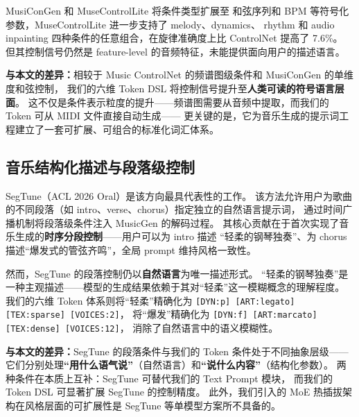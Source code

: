 MusiConGen\cite{musecong} 和 MuseControlLite\cite{muselite} 将条件类型扩展至
和弦序列和 BPM 等符号化参数，MuseControlLite 进一步支持了 melody、dynamics、
rhythm 和 audio inpainting 四种条件的任意组合，在旋律准确度上比 ControlNet 提高了 7.6\%。
但其控制信号仍然是 feature-level 的音频特征，未能提供面向用户的描述语言。

\textbf{与本文的差异：}相较于 Music ControlNet 的频谱图级条件和 MusiConGen 的单维度和弦控制，
我们的六维 Token DSL 将控制信号提升至\textbf{人类可读的符号语言层面}。
这不仅是条件表示粒度的提升——频谱图需要从音频中提取，而我们的 Token 可从 MIDI 文件直接自动生成——
更关键的是，它为音乐生成的提示词工程建立了一套可扩展、可组合的标准化词汇体系。

\subsection{音乐结构化描述与段落级控制}

SegTune\cite{segtune}（ACL 2026 Oral）是该方向最具代表性的工作。
该方法允许用户为歌曲的不同段落（如 intro、verse、chorus）指定独立的自然语言提示词，
通过时间广播机制将段落级条件注入 MusicGen 的解码过程。
其核心贡献在于首次实现了音乐生成的\textbf{时序分段控制}——用户可以为 intro 描述
“轻柔的钢琴独奏”、为 chorus 描述“爆发式的管弦齐鸣”，全局 prompt 维持风格一致性。

然而，SegTune 的段落控制仍以\textbf{自然语言}为唯一描述形式。
“轻柔的钢琴独奏”是一种主观描述——模型的生成结果依赖于其对“轻柔”这一模糊概念的理解程度。
我们的六维 Token 体系则将“轻柔”精确化为 \texttt{[DYN:p] [ART:legato] [TEX:sparse] [VOICES:2]}，
将“爆发”精确化为 \texttt{[DYN:f] [ART:marcato] [TEX:dense] [VOICES:12]}，
消除了自然语言中的语义模糊性。

\textbf{与本文的差异：}SegTune 的段落条件与我们的 Token 条件处于不同抽象层级——
它们分别处理\textbf{“用什么语气说”}（自然语言）和\textbf{“说什么内容”}（结构化参数）。
两种条件在本质上互补：SegTune 可替代我们的 Text Prompt 模块，
而我们的 Token DSL 可显著扩展 SegTune 的控制精度。
此外，我们引入的 MoE 热插拔架构在风格层面的可扩展性是 SegTune 等单模型方案所不具备的。

